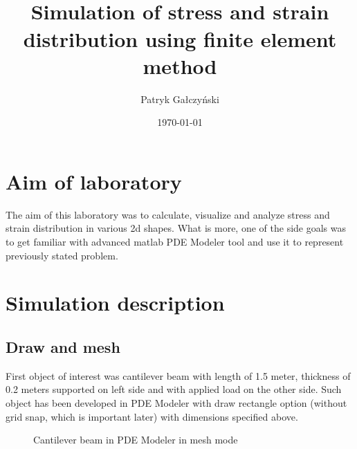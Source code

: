 \documentclass[onecolumn]{article}
\title{\spacecaps{Lab report: Lab 8 }\\
Simulation of stress and strain distribution using finite element method\\\normalsize \spacesc{Modeling of Physical Systems} }
\author{Patryk Ga\l{}czy\'nski}
\date{\today}
\begin{document}

\maketitle

\section{Aim of laboratory}
\large
The aim of this laboratory was to calculate, visualize and analyze stress and strain distribution in various 2d shapes. What is more, one of the side goals was to get familiar with advanced matlab PDE Modeler tool and use it to represent previously stated problem.

\section{Simulation description}

\subsection{Draw and mesh}
First object of interest was cantilever beam with length of 1.5 meter, thickness of 0.2 meters supported on left side and with applied load on the other side. Such object has been developed in PDE Modeler with draw rectangle option (without grid snap, which is important later) with dimensions specified above.
\\
\begin{figure}[H]
\noindent{}
\caption{Cantilever beam in PDE Modeler in mesh mode}
\end{figure}
\end{document}
